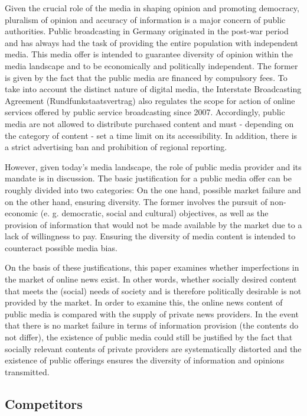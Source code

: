 \documentclass[12pt,a4paper,notitlepage]{article}
\begin{document}
Given the crucial role of the media in shaping opinion and promoting democracy, pluralism of opinion and accuracy of information is a major concern of public authorities. Public broadcasting in Germany originated in the post-war period and has always had the task of providing the entire population with independent media. This media offer is intended to guarantee diversity of opinion within the media landscape and to be economically and politically independent. The former is given by the fact that the public media are financed by compulsory fees. To take into account the distinct nature of digital media, the Interstate Broadcasting Agreement (Rundfunkstaatsvertrag) also regulates the scope for action of online services offered by public service broadcasting since 2007. Accordingly, public media are not allowed to distribute purchased content and must - depending on the category of content - set a time limit on its accessibility. In addition, there is a strict advertising ban and prohibition of regional reporting. 

However, given today's media landscape, the role of public media provider and its mandate is in discussion. The basic justification for a public media offer can be roughly divided into two categories: On the one hand, possible market failure and on the other hand, ensuring diversity. The former involves the pursuit of non-economic (e. g. democratic, social and cultural) objectives, as well as the provision of information that would not be made available by the market due to a lack of willingness to pay. Ensuring the diversity of media content is intended to counteract possible media bias. 

On the basis of these justifications, this paper examines whether imperfections in the market of online news exist. In other words, whether socially desired content that meets the (social) needs of society and is therefore politically desirable is not provided by the market. In order to examine this, the online news content of public media is compared with the supply of private news providers. In the event that there is no market failure in terms of information provision (the contents do not differ), the existence of public media could still be justified by the fact that socially relevant contents of private providers are systematically distorted and the existence of public offerings ensures the diversity of information and opinions transmitted. 

\subsection{Competitors}
\end{document}
